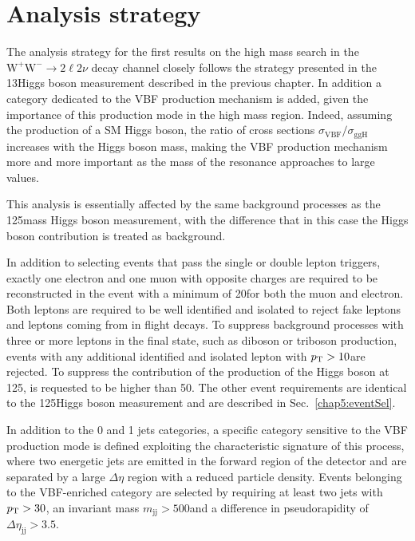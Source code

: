 \section{Analysis strategy}\label{chap6:AnalysisStrategy}

The analysis strategy for the first results on the high mass search in the $\mathrm{W^+W^-}\to2\ell2\nu$ decay channel closely follows the strategy presented in the 13\TeV Higgs boson measurement described in the previous chapter. In addition a category dedicated to the VBF production mechanism is added, given the importance of this production mode in the high mass region. Indeed, assuming the production of a SM Higgs boson, the ratio of cross sections $\sigma_\mathrm{VBF}/\sigma_\mathrm{ggH}$ increases with the Higgs boson mass, making the VBF production mechanism more and more important as the mass of the resonance approaches to large values.

This analysis is essentially affected by the same background processes as the 125\GeV mass Higgs boson measurement, with the difference that in this case the Higgs boson contribution is treated as background.

In addition to selecting events that pass the single or double lepton triggers, exactly one electron and one muon with opposite charges are required to be reconstructed in the event with a minimum \pt of 20\GeV for both the muon and electron. Both leptons are
required to be well identified and isolated to reject fake leptons and leptons
coming from in flight decays. To suppress background processes with three or more leptons in the final state, such as diboson or triboson production, events with any additional identified and isolated 
lepton with $p_\mathrm{T}>10$\GeV are rejected. To suppress the contribution of the production of the Higgs boson at 125\GeV, \mll is requested to be higher than 50\GeV. The other event requirements are identical to the 125\GeV Higgs boson measurement and are described in Sec.~\ref{chap5:eventSel}.

In addition to the 0 and 1 jets categories, a specific category sensitive to the VBF production mode is defined exploiting the characteristic signature of this process, where two energetic jets are emitted in the forward region of the detector and are separated by a large $\Delta\eta$ region with a reduced particle density. Events belonging to the VBF-enriched category are selected by requiring at least two jets with $p_\mathrm{T}>30$\GeV, an invariant mass $m_\mathrm{jj}>500$\GeV and a difference in pseudorapidity of $\Delta\eta_\mathrm{jj}>3.5$.

